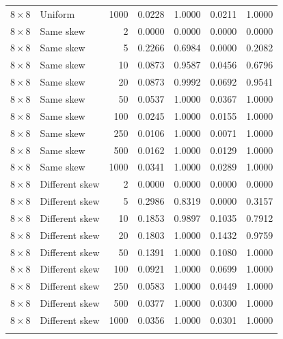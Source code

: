 \begin{longtable}{@{}llrrrrr@{}}
\(8\times8\) & Uniform & 1000 & 0.0228 & 1.0000 & 0.0211 & 1.0000 \\
\addlinespace
\(8\times8\) & Same skew & 2 & 0.0000 & 0.0000 & 0.0000 & 0.0000 \\
\(8\times8\) & Same skew & 5 & 0.2266 & 0.6984 & 0.0000 & 0.2082 \\
\(8\times8\) & Same skew & 10 & 0.0873 & 0.9587 & 0.0456 & 0.6796 \\
\(8\times8\) & Same skew & 20 & 0.0873 & 0.9992 & 0.0692 & 0.9541 \\
\(8\times8\) & Same skew & 50 & 0.0537 & 1.0000 & 0.0367 & 1.0000 \\
\(8\times8\) & Same skew & 100 & 0.0245 & 1.0000 & 0.0155 & 1.0000 \\
\(8\times8\) & Same skew & 250 & 0.0106 & 1.0000 & 0.0071 & 1.0000 \\
\(8\times8\) & Same skew & 500 & 0.0162 & 1.0000 & 0.0129 & 1.0000 \\
\(8\times8\) & Same skew & 1000 & 0.0341 & 1.0000 & 0.0289 & 1.0000 \\
\addlinespace
\(8\times8\) & Different skew & 2 & 0.0000 & 0.0000 & 0.0000 & 0.0000 \\
\(8\times8\) & Different skew & 5 & 0.2986 & 0.8319 & 0.0000 & 0.3157 \\
\(8\times8\) & Different skew & 10 & 0.1853 & 0.9897 & 0.1035 & 0.7912 \\
\(8\times8\) & Different skew & 20 & 0.1803 & 1.0000 & 0.1432 & 0.9759 \\
\(8\times8\) & Different skew & 50 & 0.1391 & 1.0000 & 0.1080 & 1.0000 \\
\(8\times8\) & Different skew & 100 & 0.0921 & 1.0000 & 0.0699 & 1.0000 \\
\(8\times8\) & Different skew & 250 & 0.0583 & 1.0000 & 0.0449 & 1.0000 \\
\(8\times8\) & Different skew & 500 & 0.0377 & 1.0000 & 0.0300 & 1.0000 \\
\(8\times8\) & Different skew & 1000 & 0.0356 & 1.0000 & 0.0301 & 1.0000 \\
\addlinespace
\bottomrule\end{longtable}
\endgroup
